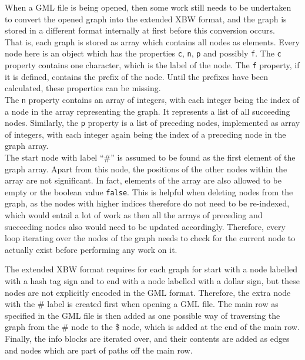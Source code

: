 \documentclass[a4paper,12pt,twoside,BCOR=10mm]{scrbook}
\begin{document}
When a GML file is being opened, then some work still needs to be undertaken 
to convert the opened graph into the extended XBW format, and the graph is stored 
in a different format internally at first before this conversion occurs. \\
That is, each graph is stored as array which contains all nodes as elements. 
Every node here is an object which has the properties \texttt{c}, \texttt{n}, \texttt{p} and 
possibly \texttt{f}. The \texttt{c} property contains one character, which is the label of the node. 
The \texttt{f} property, if it is defined, contains the prefix of the node. Until the prefixes have 
been calculated, these properties can be missing. \\
The \texttt{n} property contains an array of integers, with each integer being the index 
of a node in the array representing the graph. It represents a list of all succeeding nodes. 
Similarly, the \texttt{p} property is a list of preceding nodes, implemented as array of integers, 
with each integer again being the index of a preceding node in the graph array. \\
The start node with label “$\#$” is assumed to be found as the first element 
of the graph array. Apart from this node, the positions of the other nodes within 
the array are not significant. In fact, elements of the array are also allowed to 
be empty or the boolean value \texttt{false}. This is helpful when deleting 
nodes from the graph, as the nodes with higher indices therefore do not need to be re-indexed, 
which would entail a lot of work as then all the arrays of preceding and succeeding nodes 
also would need to be updated accordingly. 
Therefore, every loop iterating over the nodes of the graph needs to check for the 
current node to actually exist before performing any work on it.

The extended XBW format requires for each graph for start with a node labelled with a 
hash tag sign and to end with a node labelled with a dollar sign, 
but these nodes are not explicitly encoded in the GML format.
Therefore, the extra node with the $\#$ label is created first when opening a GML file. 
The main row as specified in the GML file is then added as one possible way 
of traversing the graph from the $\#$ node to the \$ node, which is added at the end of the main row. \\
Finally, the info blocks are iterated over, and their contents are added as edges and nodes which are part 
of paths off the main row.
\end{document}
